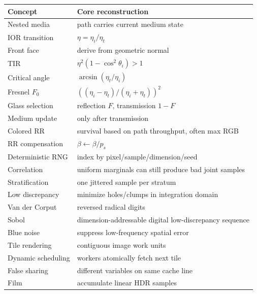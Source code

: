 {\def\LTcaptype{none} %
\begin{longtable}[]{@{}
  >{\raggedright\arraybackslash}p{}
  >{\raggedright\arraybackslash}p{}@{}}
\toprule\noalign{}
\begin{minipage}[b]{\linewidth}\raggedright
Concept
\end{minipage} & \begin{minipage}[b]{\linewidth}\raggedright
Core reconstruction
\end{minipage} \\
\midrule\noalign{}
\endhead
\bottomrule\noalign{}
\endlastfoot
Nested media & path carries current medium state \\
IOR transition & \(\eta=\eta_i/\eta_t\) \\
Front face & derive from geometric normal \\
TIR & \(\eta^2(1-\cos^2\theta_i)>1\) \\
Critical angle & \(\arcsin(\eta_t/\eta_i)\) \\
Fresnel \(F_0\) & \(((\eta_i-\eta_t)/(\eta_i+\eta_t))^2\) \\
Glass selection & reflection \(F\), transmission \(1-F\) \\
Medium update & only after transmission \\
Colored RR & survival based on path throughput, often max RGB \\
RR compensation & \(\beta\leftarrow\beta/p_s\) \\
Deterministic RNG & index by pixel/sample/dimension/seed \\
Correlation & uniform marginals can still produce bad joint samples \\
Stratification & one jittered sample per stratum \\
Low discrepancy & minimize holes/clumps in integration domain \\
Van der Corput & reversed radical digits \\
Sobol & dimension-addressable digital low-discrepancy sequence \\
Blue noise & suppress low-frequency spatial error \\
Tile rendering & contiguous image work units \\
Dynamic scheduling & workers atomically fetch next tile \\
False sharing & different variables on same cache line \\
Film & accumulate linear HDR samples \\

\end{longtable}}

